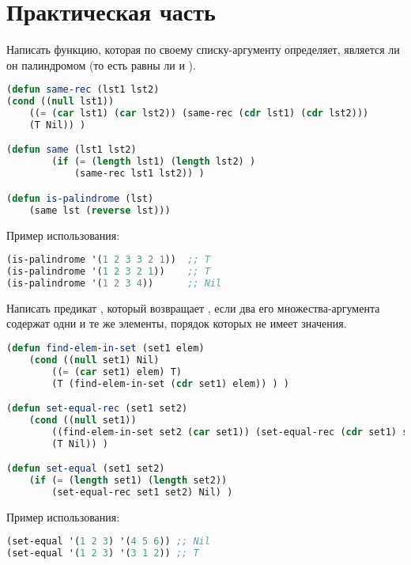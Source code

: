 \documentclass[a4paper,oneside,12pt]{extreport}
\begin{document}


\section*{Практическая часть}

\begin{task}
    Написать функцию, которая по своему списку-аргументу  определяет, является ли он палиндромом (то есть равны ли  и ).

    \begin{lstlisting}[language=Lisp]
(defun same-rec (lst1 lst2)
(cond ((null lst1)) 
    ((= (car lst1) (car lst2)) (same-rec (cdr lst1) (cdr lst2)))
    (T Nil)) )

(defun same (lst1 lst2)
        (if (= (length lst1) (length lst2) ) 
            (same-rec lst1 lst2)) )

(defun is-palindrome (lst) 
    (same lst (reverse lst)))
    \end{lstlisting}

    Пример использования:
    \begin{lstlisting}[language=Lisp]    
(is-palindrome '(1 2 3 3 2 1))  ;; T
(is-palindrome '(1 2 3 2 1))    ;; T
(is-palindrome '(1 2 3 4))      ;; Nil
    \end{lstlisting}
\end{task}
		
\begin{task}
	Написать предикат , который возвращает , если два его
    множества-аргумента содержат одни и те же элементы, порядок которых не имеет значения.


    \begin{lstlisting}[language=Lisp]
(defun find-elem-in-set (set1 elem) 
    (cond ((null set1) Nil)
        ((= (car set1) elem) T)
        (T (find-elem-in-set (cdr set1) elem)) ) )

(defun set-equal-rec (set1 set2) 
    (cond ((null set1))
        ((find-elem-in-set set2 (car set1)) (set-equal-rec (cdr set1) set2))
        (T Nil)) )

(defun set-equal (set1 set2)
    (if (= (length set1) (length set2)) 
        (set-equal-rec set1 set2) Nil) )
\end{lstlisting}

    Пример использования:
    \begin{lstlisting}[language=Lisp]
(set-equal '(1 2 3) '(4 5 6)) ;; Nil
(set-equal '(1 2 3) '(3 1 2)) ;; T
    \end{lstlisting}

\end{task}
\end{document}
